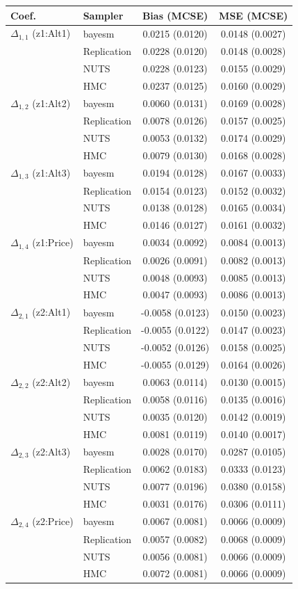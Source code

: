 \begin{tabular}{llcc}
\toprule
Coef. & Sampler & Bias (MCSE) & MSE (MCSE) \\
\midrule
$\Delta_{1,1}$ (z1:Alt1) & bayesm & 0.0215 (0.0120) & 0.0148 (0.0027) \\
 & Replication & 0.0228 (0.0120) & 0.0148 (0.0028) \\
 & NUTS & 0.0228 (0.0123) & 0.0155 (0.0029) \\
 & HMC & 0.0237 (0.0125) & 0.0160 (0.0029) \\
$\Delta_{1,2}$ (z1:Alt2) & bayesm & 0.0060 (0.0131) & 0.0169 (0.0028) \\
 & Replication & 0.0078 (0.0126) & 0.0157 (0.0025) \\
 & NUTS & 0.0053 (0.0132) & 0.0174 (0.0029) \\
 & HMC & 0.0079 (0.0130) & 0.0168 (0.0028) \\
$\Delta_{1,3}$ (z1:Alt3) & bayesm & 0.0194 (0.0128) & 0.0167 (0.0033) \\
 & Replication & 0.0154 (0.0123) & 0.0152 (0.0032) \\
 & NUTS & 0.0138 (0.0128) & 0.0165 (0.0034) \\
 & HMC & 0.0146 (0.0127) & 0.0161 (0.0032) \\
$\Delta_{1,4}$ (z1:Price) & bayesm & 0.0034 (0.0092) & 0.0084 (0.0013) \\
 & Replication & 0.0026 (0.0091) & 0.0082 (0.0013) \\
 & NUTS & 0.0048 (0.0093) & 0.0085 (0.0013) \\
 & HMC & 0.0047 (0.0093) & 0.0086 (0.0013) \\
$\Delta_{2,1}$ (z2:Alt1) & bayesm & -0.0058 (0.0123) & 0.0150 (0.0023) \\
 & Replication & -0.0055 (0.0122) & 0.0147 (0.0023) \\
 & NUTS & -0.0052 (0.0126) & 0.0158 (0.0025) \\
 & HMC & -0.0055 (0.0129) & 0.0164 (0.0026) \\
$\Delta_{2,2}$ (z2:Alt2) & bayesm & 0.0063 (0.0114) & 0.0130 (0.0015) \\
 & Replication & 0.0058 (0.0116) & 0.0135 (0.0016) \\
 & NUTS & 0.0035 (0.0120) & 0.0142 (0.0019) \\
 & HMC & 0.0081 (0.0119) & 0.0140 (0.0017) \\
$\Delta_{2,3}$ (z2:Alt3) & bayesm & 0.0028 (0.0170) & 0.0287 (0.0105) \\
 & Replication & 0.0062 (0.0183) & 0.0333 (0.0123) \\
 & NUTS & 0.0077 (0.0196) & 0.0380 (0.0158) \\
 & HMC & 0.0031 (0.0176) & 0.0306 (0.0111) \\
$\Delta_{2,4}$ (z2:Price) & bayesm & 0.0067 (0.0081) & 0.0066 (0.0009) \\
 & Replication & 0.0057 (0.0082) & 0.0068 (0.0009) \\
 & NUTS & 0.0056 (0.0081) & 0.0066 (0.0009) \\
 & HMC & 0.0072 (0.0081) & 0.0066 (0.0009) \\
\bottomrule
\end{tabular}
